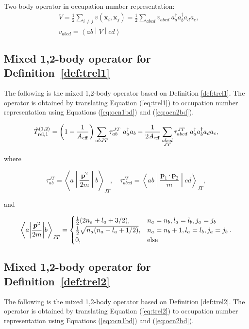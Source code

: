 \documentclass{article}
\def\aeff{A_{\rm{eff}}}
\def\trelopi_#1^#2{\hat{T}_{\rm{rel}, #1}^{#2}}
\def\momvect{\boldsymbol{p}}
\def\posvect{\boldsymbol{x}}
\def\creop{a^{\dagger}}
\def\annop{a}
\def\matelt#1#2#3{\left\langle{#1}\middle|{#2}\middle|{#3}\right\rangle}
\begin{document}
Two body operator in occupation number representation:
\begin{equation}\label{eq:ocn2bd}
  \begin{aligned}
    &V = \frac{1}{2}\displaystyle\sum_{i \neq j}
    v\left(\posvect_i, \posvect_j\right) =
    \frac{1}{2}\displaystyle\sum_{abcd}
    v_{abcd}~\creop_a\creop_b\annop_d\annop_c,\\
    &v_{abcd} = \matelt{ab}{V}{cd}
  \end{aligned}
\end{equation}

\subsection{Mixed 1,2-body operator for Definition~\ref{def:trel1}}
The following is the mixed 1,2-body operator based on Definition
\ref{def:trel1}. The operator is obtained by translating Equation
(\ref{eq:trel1}) to occupation number representation using Equations
(\ref{eq:ocn1bd}) and (\ref{eq:ocn2bd}).

\begin{equation}\label{eq:trel1op1,2}
  \trelopi_1^{(1,2)} = \left(1-\frac{1}{\aeff}\right)
  \displaystyle\sum_{abJT}\tau_{ab}^{JT}~\creop_a\annop_b
  -\frac{1}{2\aeff} \displaystyle\sum_{\substack{abcd\\JT}}
  \tau_{abcd}^{JT}~\creop_a\creop_b\annop_d\annop_c,
\end{equation}

where

\begin{equation}\label{eq:tab,tabcd}
  \tau_{ab}^{JT} = \matelt{a}{\frac{\momvect^2}{2m}}{b}_{JT}, \quad
  \tau_{abcd}^{JT} = \matelt{ab}{\frac{\momvect_1\cdot\momvect_2}{m}}{cd}_{JT},
\end{equation}

and

\begin{equation*}
  \matelt{a}{\frac{\momvect^2}{2m}}{b}_{JT} = 
  \begin{cases}
    \frac{1}{2}(2n_a+l_a+3/2),
    & n_a=n_b, l_a=l_b, j_a=j_b\\
    \frac{1}{2}\sqrt{n_a(n_a+l_a+1/2)}, 
    & n_a=n_b+1, l_a=l_b, j_a=j_b\\
    0, & \rm{else}
  \end{cases}.
\end{equation*}

\subsection{Mixed 1,2-body operator for Definition~\ref{def:trel2}}
The following is the mixed 1,2-body operator based on Definition
\ref{def:trel2}. The operator is obtained by translating Equation
(\ref{eq:trel2}) to occupation number representation using Equations
(\ref{eq:ocn1bd}) and (\ref{eq:ocn2bd}).
\end{document}
